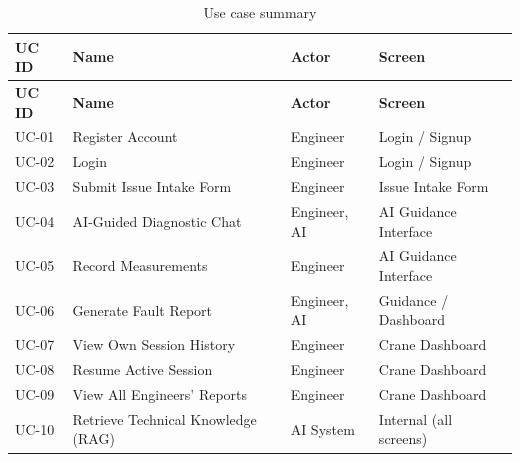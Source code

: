 \begin{longtable}{p{1.8cm} p{4.2cm} p{3.5cm} p{4cm}}
    \caption{Use case summary\label{tab:uc_summary}} \\
    \hline
    \textbf{UC ID} & \textbf{Name} & \textbf{Actor} & \textbf{Screen} \\
    \hline
    \endfirsthead
    \hline
    \textbf{UC ID} & \textbf{Name} & \textbf{Actor} & \textbf{Screen} \\
    \hline
    \endhead
    \hline
    \endfoot
    UC-01 & Register Account          & Engineer          & Login / Signup \\
    UC-02 & Login                     & Engineer          & Login / Signup \\
    UC-03 & Submit Issue Intake Form  & Engineer          & Issue Intake Form \\
    UC-04 & AI-Guided Diagnostic Chat & Engineer, AI      & AI Guidance Interface \\
    UC-05 & Record Measurements       & Engineer          & AI Guidance Interface \\
    UC-06 & Generate Fault Report     & Engineer, AI      & Guidance / Dashboard \\
    UC-07 & View Own Session History  & Engineer          & Crane Dashboard \\
    UC-08 & Resume Active Session     & Engineer          & Crane Dashboard \\
    UC-09 & View All Engineers' Reports & Engineer        & Crane Dashboard \\
    UC-10 & Retrieve Technical Knowledge (RAG) & AI System & Internal (all screens) \\
    \hline
\end{longtable}
